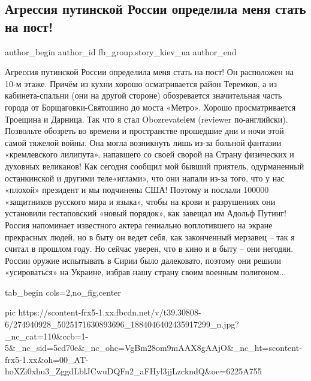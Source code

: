  
 
 
 
 
 
\subsection{Агрессия путинской России определила меня стать на пост!}
\label{sec:28_02_2022.fb.fb_group.story_kiev_ua.1.post}
 
\ifcmt
 author_begin
   author_id fb_group.story_kiev_ua
 author_end
\fi

Агрессия путинской России определила меня стать на пост! Он расположен на 10-м
этаже. Причём из кухни хорошо осматривается район Теремков, а из
кабинета-спальни (они на другой стороне) обозревается значительная часть города
от Борщаговки-Святошино до моста «Метро». Хорошо просматривается Троещина и
Дарница. Так что я стал Obozrevatelем (reviewer по-английски). Позвольте
обозреть во времени и пространстве прошедшие дни и ночи этой самой тяжелой
войны. Она могла возникнуть лишь из-за больной фантазии «кремлевского
лилипута», напавшего со своей сворой на Страну физических и духовных великанов!
Как сегодня сообщил мой бывший приятель, одурманенный останкинской и другими
теле«иглами», что они напали из-за того, что у нас «плохой» президент и мы
подчинены США! Поэтому и послали 100000 «защитников русского мира и языка»,
чтобы на крови и разрушениях они установили гестаповский «новый порядок», как
завещал им Адольф Путинг! Россия напоминает известного актера гениально
воплотившего на экране прекрасных людей, но в быту он ведет себя, как
законченный мерзавец – так я считал в прошлом году. Но сейчас уверен, что в
кино и в быту – они негодяи.  России оружие испытывать в Сирии было далековато,
поэтому они решили «усироваться» на Украине, избрав нашу страну своим военным
полигоном...

\ifcmt
  tab_begin cols=2,no_fig,center

     pic https://scontent-frx5-1.xx.fbcdn.net/v/t39.30808-6/274940928_5025171630893696_1884046402435917299_n.jpg?_nc_cat=110&ccb=1-5&_nc_sid=5cd70e&_nc_ohc=VgBm28om9mAAX8gAAjO&_nc_ht=scontent-frx5-1.xx&oh=00_AT-hoXZi0xhu3_ZggdLblJCwuDQFn2_aFHyl3jjLzckndQ&oe=6225A755

